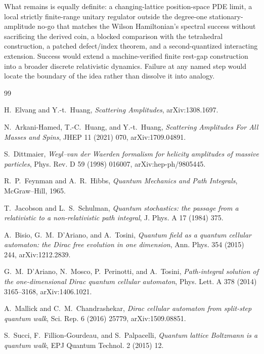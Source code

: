 \documentclass[11pt]{article}
\begin{document}
What remains is equally definite: a changing-lattice position-space PDE limit, a local
 strictly finite-range unitary regulator outside the degree-one
 stationary-amplitude no-go that matches the Wilson Hamiltonian's spectral
 success without sacrificing the derived coin, a blocked
 comparison with the tetrahedral construction, a patched defect/index theorem,
 and a second-quantized interacting extension.  Success would extend a machine-verified finite
rest-gap construction into a broader discrete relativistic dynamics.  Failure
at any named step would locate the boundary of the idea rather than dissolve
it into analogy.

\begin{thebibliography}{99}

H.~Elvang and Y.-t.~Huang,
\emph{Scattering Amplitudes}, arXiv:1308.1697.

N.~Arkani-Hamed, T.-C.~Huang, and Y.-t.~Huang,
\emph{Scattering Amplitudes For All Masses and Spins},
JHEP 11 (2021) 070, arXiv:1709.04891.

S.~Dittmaier,
\emph{Weyl--van der Waerden formalism for helicity amplitudes of massive
particles}, Phys. Rev. D 59 (1998) 016007, arXiv:hep-ph/9805445.

R.~P.~Feynman and A.~R.~Hibbs,
\emph{Quantum Mechanics and Path Integrals}, McGraw--Hill, 1965.

T.~Jacobson and L.~S.~Schulman,
\emph{Quantum stochastics: the passage from a relativistic to a
non-relativistic path integral}, J. Phys. A 17 (1984) 375.

A.~Bisio, G.~M.~D'Ariano, and A.~Tosini,
\emph{Quantum field as a quantum cellular automaton: the Dirac free evolution
in one dimension}, Ann. Phys. 354 (2015) 244, arXiv:1212.2839.

G.~M.~D'Ariano, N.~Mosco, P.~Perinotti, and A.~Tosini,
\emph{Path-integral solution of the one-dimensional Dirac quantum cellular
automaton}, Phys. Lett. A 378 (2014) 3165--3168, arXiv:1406.1021.

A.~Mallick and C.~M.~Chandrashekar,
\emph{Dirac cellular automaton from split-step quantum walk},
Sci. Rep. 6 (2016) 25779, arXiv:1509.08851.

S.~Succi, F.~Fillion-Gourdeau, and S.~Palpacelli,
\emph{Quantum lattice Boltzmann is a quantum walk},
EPJ Quantum Technol. 2 (2015) 12.


\end{thebibliography}
\end{document}
